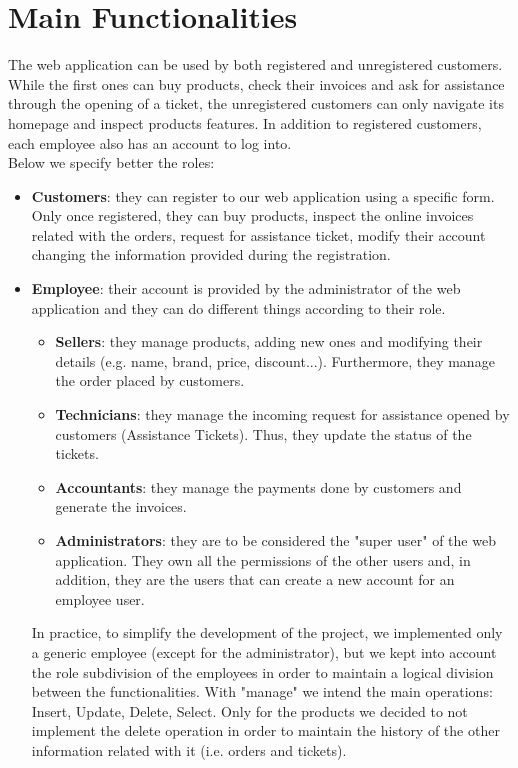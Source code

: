 \section{Main Functionalities}

The web application can be used by both registered and unregistered customers. While the first ones can buy products, check their invoices and ask for assistance through the opening of a ticket, the unregistered customers can only navigate its homepage and inspect products features. In addition to registered customers, each employee also has an account to log into.
\\
Below we specify better the roles:
\begin{itemize}
    \item \textbf{Customers}: they can register to our web application using a specific form. Only once registered, they can buy products, inspect the online invoices related with the orders, request for assistance ticket, modify their account changing the information provided during the registration.
    \item \textbf{Employee}: their account is provided by the administrator of the web application and they can do different things according to their role.
    \begin{itemize}
        \item \textbf{Sellers}: they manage products, adding new ones and modifying  their details (e.g. name, brand, price, discount...). Furthermore, they manage the order placed by customers.
        \item \textbf{Technicians}: they manage the incoming request for assistance opened by customers (Assistance Tickets). Thus, they update the status of the tickets.
        \item \textbf{Accountants}: they manage the payments done by customers and generate the invoices.
        \item \textbf{Administrators}: they are to be considered the "super user" of the web application. They own all the permissions of the other users and, in addition, they are the users that can create a new account for an employee user.
    \end{itemize}
    In practice, to simplify the development of the project, we implemented only a generic employee (except for the administrator), but we kept into account the role subdivision of the employees in order to maintain a logical division between the functionalities.
    With "manage" we intend the main operations: Insert, Update, Delete, Select. Only for the products  we decided to not implement the delete operation in order to maintain the history of the other information related with it (i.e. orders and tickets).
\end{itemize}